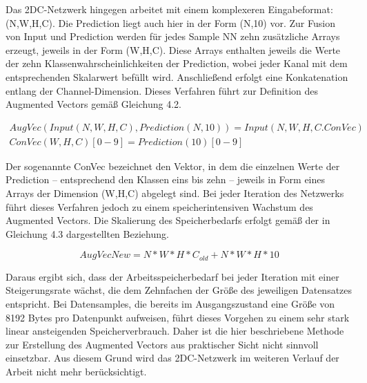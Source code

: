 Das 2DC-Netzwerk hingegen arbeitet mit einem komplexeren Eingabeformat: (N,W,H,C). Die Prediction liegt auch hier in der 
Form (N,10) vor. Zur Fusion von Input und Prediction werden für jedes Sample NN zehn zusätzliche Arrays erzeugt, jeweils in der 
Form (W,H,C). Diese Arrays enthalten jeweils die Werte der zehn Klassenwahrscheinlichkeiten der Prediction, wobei jeder Kanal mit 
dem entsprechenden Skalarwert befüllt wird. Anschließend erfolgt eine Konkatenation entlang der Channel-Dimension. Dieses Verfahren führt zur 
Definition des Augmented Vectors gemäß Gleichung 4.2.

\begin{multline}
    AugVec(Input(N, W, H, C), Prediction(N, 10)) = Input(N, W, H, C.ConVec)\\
    ConVec(W, H, C)[0-9] = Prediction(10)[0-9]
\end{multline}

Der sogenannte ConVec bezeichnet den Vektor, in dem die einzelnen Werte der Prediction – entsprechend den Klassen eins bis zehn – jeweils in 
Form eines Arrays der Dimension (W,H,C) abgelegt sind. Bei jeder Iteration des Netzwerks führt dieses Verfahren jedoch zu einem 
speicherintensiven Wachstum des Augmented Vectors. Die Skalierung des Speicherbedarfs erfolgt gemäß der in Gleichung 4.3 dargestellten Beziehung.

\begin{equation}
    AugVecNew = N*W*H*C_{old} + N*W*H*10
\end{equation}

Daraus ergibt sich, dass der Arbeitsspeicherbedarf bei jeder Iteration mit einer Steigerungsrate wächst, die dem Zehnfachen der Größe des 
jeweiligen Datensatzes entspricht. Bei Datensamples, die bereits im Ausgangszustand eine Größe von 8192 Bytes pro Datenpunkt aufweisen, führt 
dieses Vorgehen zu einem sehr stark linear ansteigenden Speicherverbrauch. Daher ist die hier beschriebene Methode zur Erstellung des Augmented Vectors aus 
praktischer Sicht nicht sinnvoll einsetzbar. Aus diesem Grund wird das 2DC-Netzwerk im weiteren Verlauf der Arbeit nicht mehr berücksichtigt.
